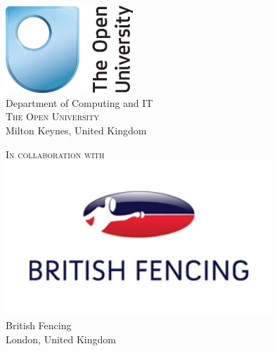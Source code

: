 \begin{titlepage}
\begin{center}
\begin{minipage}[t][][t]{0.45\textwidth}
\begin{center}
\includegraphics[width=0.36\textwidth]{ou_cmyk_masterlogo_29mm}\\[0.4in]
\Large{Department of Computing and IT}\\
\normalsize
\textsc{The Open University}\\
Milton Keynes, United Kingdom \\
\vspace{0.2cm}
\end{center}
\end{minipage}%
\begin{minipage}[t][][t]{0.45\textwidth}
\begin{center}
\textsc{In collaboration with}\\
\includegraphics[width=0.75\textwidth]{british-fencing}\\[0.1in]
\Large{British Fencing}\\
\normalsize
London, United Kingdom \\
\vspace{0.2cm}
\end{center}
\end{minipage}%

\end{center}


\end{titlepage}
